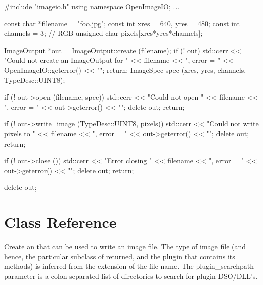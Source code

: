 \begin{code}
        #include "imageio.h"
        using namespace OpenImageIO;
        ...

        const char *filename = "foo.jpg";
        const int xres = 640, yres = 480;
        const int channels = 3;  // RGB
        unsigned char pixels[xres*yres*channels];

        ImageOutput *out = ImageOutput::create (filename);
        if (! out) {
            std::cerr << "Could not create an ImageOutput for " 
                      << filename << ", error = " 
                      << OpenImageIO::geterror() << "\n";
            return;
        }
        ImageSpec spec (xres, yres, channels, TypeDesc::UINT8);

        if (! out->open (filename, spec)) {
            std::cerr << "Could not open " << filename 
                      << ", error = " << out->geterror() << "\n";
            delete out;
            return;
        }

        if (! out->write_image (TypeDesc::UINT8, pixels)) {
            std::cerr << "Could not write pixels to " << filename 
                      << ", error = " << out->geterror() << "\n";
            delete out;
            return;
        }

        if (! out->close ()) {
            std::cerr << "Error closing " << filename 
                      << ", error = " << out->geterror() << "\n";
            delete out;
            return;
        }

        delete out;
\end{code}



\section{\ImageOutput Class Reference}
\label{sec:imageoutput:reference}


Create an \ImageOutput that can be used to write an image file.  The
type of image file (and hence, the particular subclass of \ImageOutput
returned, and the plugin that contains its methods) is inferred from the
extension of the file name.  The {\kw plugin_searchpath} parameter is a
colon-separated list of directories to search for \product plugin
DSO/DLL's.

